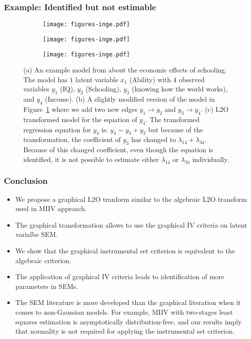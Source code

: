 \documentclass{beamer}
\begin{document}
\begin{frame}
	\frametitle{Example: Identified but not estimable}
\begin{figure}[t]
	\centering
	\begin{subfigure}[b]{0.33 \linewidth}
		\centering
		\texttt{[image: figures-inge.pdf]}
		\caption{}
		\label{fig:example_original_model}
	\end{subfigure}%
	\begin{subfigure}[b]{0.33 \linewidth}
		\centering
		\texttt{[image: figures-inge.pdf]}
		\caption{}
		\label{fig:example_incorrect_estimate}
	\end{subfigure}%
	\begin{subfigure}[b]{0.33 \linewidth}
		\centering
		\texttt{[image: figures-inge.pdf]}
		\caption{}
		\label{fig:transform_incorrect_estimate}
	\end{subfigure}%
	\caption{(a) An example model from 
	about the economic effects of schooling. The model has $ 1 $ latent
	variable $x_1$ (Ability) with $ 4 $ observed variables $ y_1 $ (IQ), $
	y_2 $ (Schooling), $ y_3 $ (knowing how the world works), and $ y_4 $
	(Income). (b) A slightly modified version of the model in
	Figure~\ref{fig:example_original_model} where we add two new edges $ y_1
	\rightarrow y_2 $ and $ y_3 \rightarrow y_4 $.  (c) L2O transformed
	model for the equation of $ y_4 $. The transformed regression equation
	for $ y_4 $ is: $ y_4 \sim y_3 + y_2 $ but because of the
	transformation, the coefficient of $ y_3 $ has changed
	to $ \lambda_{14} + \lambda_{34} $. Because of this changed
	coefficient, even though the equation is identified, it is not possible
	to estimate either $ \lambda_{14} $ or $ \lambda_{34} $ individually.
	}
\label{fig:examples5}
\end{figure}
\end{frame}

\begin{frame}
	\frametitle{Conclusion}
	\begin{itemize}
		\item We propose a graphical L2O tranform similar to the algebraic L2O transform used in MIIV approach.
		\item The graphical transformation allows to use the graphical IV criteria on latent varialbe SEM.
		\item We show that the graphical instrumental set criterion is equivalent to the algebraic criterion.
		\item The application of graphical IV criteria leads to identification of more parameters in SEMs.
		\item The SEM literature is more developed than the graphical
			literation when it comes to non-Gaussian models. For
			example, MIIV with two-stages least squares estimation
			is asymptotically distribution-free, and our results
			imply that normality is not required for applying the
			instrumental set criterion.
	\end{itemize}
\end{frame}
\end{document}
